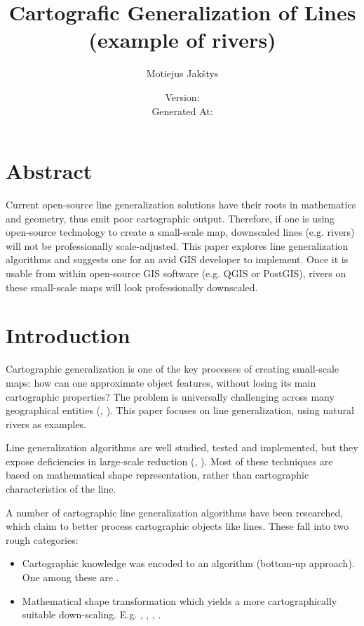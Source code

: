\documentclass{article}
\title{
    Cartografic Generalization of Lines \\
    (example of rivers) \\ \vspace{4mm}
}
\author{Motiejus Jakštys}
\date{
    \vspace{10mm}
    Version: \VCDescribe \\ \vspace{4mm}
    Generated At: \GeneratedAt
}
\begin{document}
\maketitle

\newpage

\section{Abstract}
\label{sec:abstract}

Current open-source line generalization solutions have their roots in
mathematics and geometry, thus emit poor cartographic output. Therefore, if one
is using open-source technology to create a small-scale map, downscaled lines
(e.g. rivers) will not be professionally scale-adjusted. This paper explores
line generalization algorithms and suggests one for an avid GIS developer to
implement. Once it is usable from within open-source GIS software (e.g. QGIS or
PostGIS), rivers on these small-scale maps will look professionally downscaled.

\section{Introduction}
\label{sec:introduction}

Cartographic generalization is one of the key processes of creating small-scale
maps: how can one approximate object features, without losing its main
cartographic properties? The problem is universally challenging across many
geographical entities (\cite{muller1991generalization},
\cite{mcmaster1992generalization}). This paper focuses on line generalization,
using natural rivers as examples.

Line generalization algorithms are well studied, tested and implemented, but
they expose deficiencies in large-scale reduction (\cite{monmonier1986toward},
\cite{mcmaster1993spatial}). Most of these techniques are based on mathematical
shape representation, rather than cartographic characteristics of the line.

A number of cartographic line generalization algorithms have been researched,
which claim to better process cartographic objects like lines. These fall into
two rough categories:
\begin{itemize}
    \item Cartographic knowledge was encoded to an algorithm (bottom-up
        approach). One among these are \cite{wang1998line}.
    \item Mathematical shape transformation which yields a more
        cartographically suitable down-scaling. E.g. \cite{jiang2003line},
        \cite{dyken2009simultaneous}, \cite{mustafa2006dynamic},
        \cite{nollenburg2008morphing}.
\end{itemize}
\end{document}
